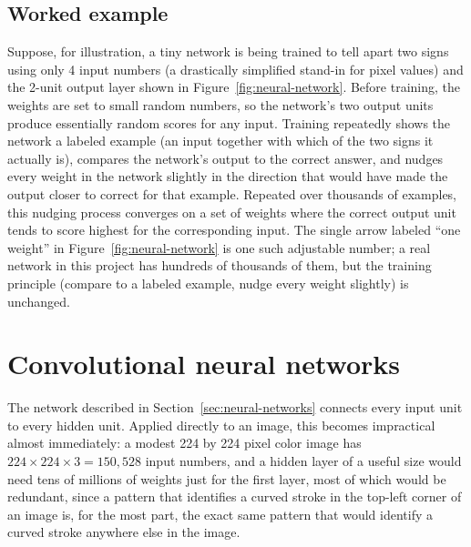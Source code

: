 \documentclass[11pt,a4paper]{report}
\begin{document}
\subsection*{Worked example}

Suppose, for illustration, a tiny network is being trained to tell apart two
signs using only 4 input numbers (a drastically simplified stand-in for
pixel values) and the 2-unit output layer shown in
Figure~\ref{fig:neural-network}. Before training, the weights are set to
small random numbers, so the network's two output units produce essentially
random scores for any input. Training repeatedly shows the network a labeled
example (an input together with which of the two signs it actually is),
compares the network's output to the correct answer, and nudges every weight
in the network slightly in the direction that would have made the output
closer to correct for that example. Repeated over thousands of examples,
this nudging process converges on a set of weights where the correct output
unit tends to score highest for the corresponding input. The single arrow
labeled ``one weight'' in Figure~\ref{fig:neural-network} is one such
adjustable number; a real network in this project has hundreds of thousands
of them, but the training principle (compare to a labeled example, nudge
every weight slightly) is unchanged.

\section{Convolutional neural networks}
\label{sec:cnn}

The network described in Section~\ref{sec:neural-networks} connects every
input unit to every hidden unit. Applied directly to an image, this becomes
impractical almost immediately: a modest 224 by 224 pixel color image has
$224 \times 224 \times 3 = 150{,}528$ input numbers, and a hidden layer of a
useful size would need tens of millions of weights just for the first layer,
most of which would be redundant, since a pattern that identifies a curved
stroke in the top-left corner of an image is, for the most part, the exact
same pattern that would identify a curved stroke anywhere else in the image.
\end{document}
